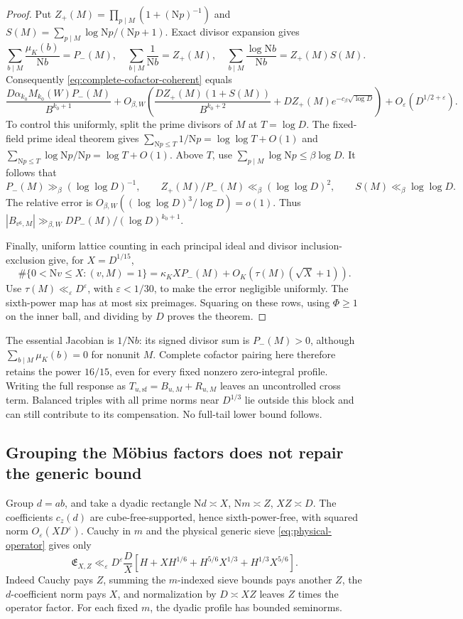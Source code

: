 \documentclass[11pt]{article}
\numberwithin{equation}{section}
\theoremstyle{definition}
\theoremstyle{remark}
\newcommand{\N}{\mathrm N}
\newcommand{\muK}{\mu_K}
\newcommand{\eps}{\varepsilon}
\begin{document}
\begin{proof}
Put \(Z_+(M)=\prod_{p\mid M}(1+(\N p)^{-1})\) and
\(S(M)=\sum_{p\mid M}\log\N p/(\N p+1)\). Exact divisor
expansion gives
\[
 \sum_{b\mid M}\frac{\muK(b)}{\N b}=P_-(M),\quad
 \sum_{b\mid M}\frac1{\N b}=Z_+(M),\quad
 \sum_{b\mid M}\frac{\log\N b}{\N b}=Z_+(M)S(M).
\]
Consequently \eqref{eq:complete-cofactor-coherent} equals
\[
 \frac{D\alpha_{k_0}M_{k_0}(W)P_-(M)}{B^{k_0+1}}
 +O_{\beta,W}\left(\frac{DZ_+(M)(1+S(M))}{B^{k_0+2}}
       +DZ_+(M)e^{-c_\beta\sqrt{\log D}}\right)
 +O_\eps(D^{1/2+\eps}).
\]
To control this uniformly, split the prime divisors of \(M\) at
\(T=\log D\). The fixed-field prime ideal theorem gives
\(\sum_{\N p\le T}1/\N p=\log\log T+O(1)\) and
\(\sum_{\N p\le T}\log\N p/\N p=\log T+O(1)\).
Above \(T\), use \(\sum_{p\mid M}\log\N p\le\beta\log D\).
It follows that
\[
 P_-(M)\gg_\beta(\log\log D)^{-1},\qquad
 Z_+(M)/P_-(M)\ll_\beta(\log\log D)^2,\qquad
 S(M)\ll_\beta\log\log D.
\]
The relative error is \(O_{\beta,W}((\log\log D)^3/\log D)=o(1)\).
Thus \(|B_{v^6,M}|\gg_{\beta,W}DP_-(M)/(\log D)^{k_0+1}\).

Finally, uniform lattice counting in each principal ideal and divisor
inclusion-exclusion give, for \(X=D^{1/15}\),
\[
 \#\{0<\N v\le X:(v,M)=1\}
 =\kappa_K XP_-(M)+O_K(\tau(M)(\sqrt X+1)).
\]
Use \(\tau(M)\ll_\eps D^\eps\), with \(\eps<1/30\), to
make the error negligible uniformly. The sixth-power map has at most
six preimages. Squaring on these rows, using \(\Phi\ge1\) on the
inner ball, and dividing by \(D\) proves the theorem.
\end{proof}

The essential Jacobian is \(1/\N b\): its signed divisor sum is
\(P_-(M)>0\), although \(\sum_{b\mid M}\muK(b)=0\) for
nonunit \(M\). Complete cofactor pairing here therefore retains the
power \(16/15\), even for every fixed nonzero zero-integral profile.
Writing the full response as \(T_{u,\mathrm{sf}}=B_{u,M}+R_{u,M}\)
leaves an uncontrolled cross term. Balanced triples with all prime
norms near \(D^{1/3}\) lie outside this block and can still contribute
to its compensation. No full-tail lower bound follows.

\subsection{Grouping the Möbius factors does not repair the generic bound}

Group \(d=ab\), and take a dyadic rectangle
\(\N d\asymp X\), \(\N m\asymp Z\), \(XZ\asymp D\).
The coefficients \(c_z(d)\) are cube-free-supported, hence
sixth-power-free, with squared norm \(O_\eps(XD^\eps)\).
Cauchy in \(m\) and the physical generic sieve
\eqref{eq:physical-operator} gives only
\begin{equation}\label{eq:generic-bilinear}
 \mathfrak E_{X,Z}\ll_\eps D^\eps\frac D X
 \left[H+XH^{1/6}+H^{5/6}X^{1/3}+H^{1/3}X^{5/6}\right].
\end{equation}
Indeed Cauchy pays \(Z\), summing the \(m\)-indexed sieve bounds
pays another \(Z\), the \(d\)-coefficient norm pays \(X\), and
normalization by \(D\asymp XZ\) leaves \(Z\) times the operator factor.
For each fixed \(m\), the dyadic profile has bounded seminorms.
\end{document}
